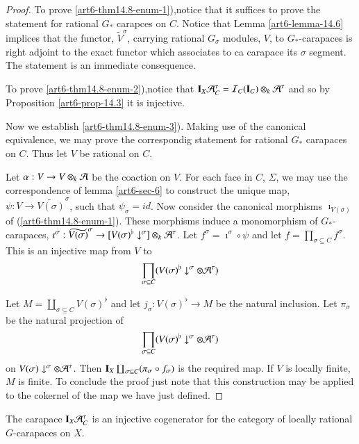 \begin{proof}
To prove \ref{art6-thm14.8-enum-1}),notice that it suffices to prove the statement for rational $G_{*}$ carapces on $C$. Notice that Lemma \ref{art6-lemma-14.6} implices that the functor, $\widetilde{V}^{\sigma}$, carrying rational $G_{\sigma}$ modules, $V$, to $G_{*}$-carapaces is right adjoint to the exact functor which associates to ca carapace its $\sigma$ segment. The statement is an immediate consequence.

To prove \ref{art6-thm14.8-enum-2}),notice that $\mathbf{I}_{X}\mathcal{A}_{C}^{\tau} = \mathcal{I}_{C}(\mathbf{I}_{C}) \otimes_{k} \mathcal{A}^{\tau}$ and so by Proposition \ref{art6-prop-14.3} it is injective.

Now we establish \ref{art6-thm14.8-enum-3}). Making use of the canonical equivalence, we may prove the correspondig statement for rational $G_{*}$ carapaces on $C$. Thus let $V$ be rational on $C$.

Let $\alpha : V \rightarrow V \otimes_{k} \mathcal{A}$ be the coaction on $V$. For each face in $C$, $\Sigma$, we may use the correspondence of lemma \ref{art6-sec-6} to construct the unique map, $\psi: V \rightarrow \widetilde{V(\sigma)}^{\sigma}$, such that $\psi_{\sigma} = id$. Now consider the canonical morphisms $\imath_{V(\sigma)}$ of
 (\ref{art6-thm14.8-enum-1}). These morphisms induce a monomorphism of $G_{*}$-carapaces, $\imath^{\sigma} : \widetilde{V(\sigma)}^{\sigma} \rightarrow [V(\sigma)^{\flat}\downarrow^{\sigma}]\otimes_{k}\mathcal{A}^{\tau}$. Let $f^{\sigma} = \imath^{\sigma} \circ \psi$ and let $f = \prod_{\sigma \subseteq C}f^{\sigma}$. This is an injective map from $V$ to
 $$
 \prod_{\sigma \subseteq C}(V(\sigma)^\flat \downarrow^{\sigma} \otimes \mathcal{A}^{\tau})
 $$

 Let $M= \coprod_{\sigma \subseteq C}V(\sigma)^{\flat}$ and let $j_{\sigma} : V(\sigma)^{\flat} \rightarrow M$ be the natural inclusion. Let $\pi_{\sigma}$ be the natural projection of
 $$
 \prod_{\sigma \subseteq C}(V(\sigma)^{\flat} \downarrow^{\sigma} \otimes \mathcal{A}^{\tau})
 $$
 on $V(\sigma) \downarrow^{\sigma} \otimes \mathcal{A}^{\tau}$. Then $\mathbf{I}_{X}\coprod_{\sigma \subseteq C}(\pi_{\sigma} \circ f_{\sigma})$ is the required map. If $V$ is locally finite, $M$ is finite. To conclude the proof just note that this construction may be applied to the cokernel of the map we have just defined.
\end{proof}

\begin{coro}\label{art6-corollary-14.9}
The carapace $\mathbf{I}_{X}\mathcal{A}_{C}^{\tau}$ is an injective cogenerator for the category of locally rational $G$-carapaces on $X$.
\end{coro}

